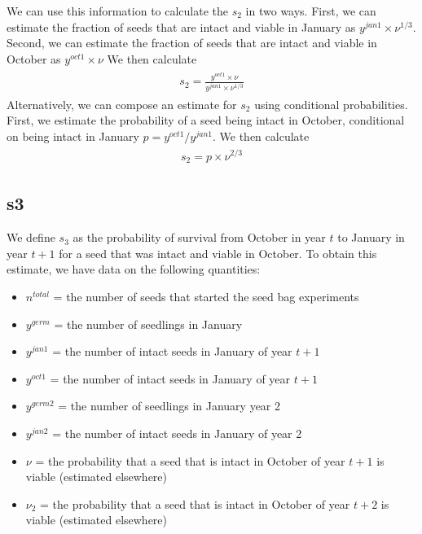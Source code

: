 \documentclass[12pt, oneside]{article}   	%
\begin{document}
We can use this information to calculate the $s_2$ in two ways. First, we can estimate the fraction of seeds that are intact and viable in January as $y^{jan1}\times \nu^{1/3}$. Second, we can estimate the fraction of seeds that are intact and viable in October as $y^{oct1}\times \nu$ We then calculate 
%
    \begin{align}
\begin{split}
s_2 = \frac{ y^{oct1}\times \nu }{ y^{jan1}\times \nu^{1/3} }
  \end{split}
\end{align}
%
Alternatively, we can compose an estimate for $s_2$ using conditional probabilities. First, we estimate the probability of a seed being intact in October, conditional on being intact in January $ p = y^{oct1} / y^{jan1} $. We then calculate 
%
    \begin{align}
\begin{split}
s_2 = p \times \nu^{2/3}
  \end{split}
\end{align}
%
\subsection*{s3}

We define $s_3$ as the probability of survival from October in year $t$ to January in year $t+1$ for a seed that was intact and viable in October. To obtain this estimate, we have data on the following quantities:

\begin{itemize}
	\item $n^{total}$ = the number of seeds that started the seed bag experiments
	\item $y^{germ}$ = the number of seedlings in January
	\item $y^{jan1}$ = the number of intact seeds in January of year $t+1$
	\item $y^{oct1}$ = the number of intact seeds in January of year $t+1$
	\item $y^{germ2}$ = the number of seedlings in January year 2
	\item $y^{jan2}$ = the number of intact seeds in January of year 2
	\item $\nu$ = the probability that a seed that is intact in October of year $t+1$ is viable (estimated elsewhere)
	\item $\nu_2$ = the probability that a seed that is intact in October of year $t+2$ is viable (estimated elsewhere)

\end{itemize}
\end{document}
